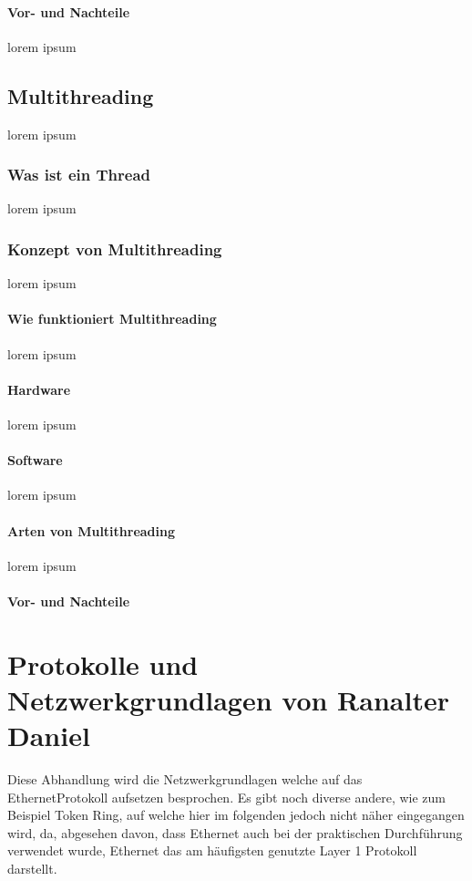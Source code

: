 \documentclass[12pt,a4paper]{report}
\begin{document}
\paragraph{Vor- und Nachteile}
lorem ipsum
\subsection{Multithreading}
lorem ipsum
\subsubsection{Was ist ein Thread}
lorem ipsum
\subsubsection{Konzept von Multithreading}
lorem ipsum
\paragraph{Wie funktioniert Multithreading}
lorem ipsum
\paragraph{Hardware}
lorem ipsum
\paragraph{Software}
lorem ipsum
\paragraph{Arten von Multithreading}
lorem ipsum
\paragraph{Vor- und Nachteile}


\section{Protokolle und Netzwerkgrundlagen von Ranalter Daniel}
Diese Abhandlung wird die Netzwerkgrundlagen welche auf das \glqq Ethernet\grqq Protokoll aufsetzen besprochen. Es gibt noch diverse andere, wie zum Beispiel \glqq Token Ring\grqq , auf welche hier im folgenden jedoch nicht näher eingegangen wird, da, abgesehen davon, dass Ethernet auch bei der praktischen Durchführung verwendet wurde, Ethernet das am häufigsten genutzte Layer 1 Protokoll darstellt. 
\end{document}
